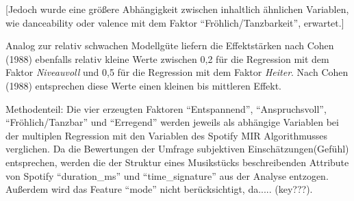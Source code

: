 [Jedoch wurde eine größere Abhängigkeit zwischen inhaltlich ähnlichen Variablen, wie danceability oder valence mit dem Faktor ``Fröhlich/Tanzbarkeit'', erwartet.]


Analog zur relativ schwachen Modellgüte liefern die Effektstärken nach Cohen (1988) ebenfalls relativ kleine Werte zwischen 0,2 für die Regression mit dem Faktor \textit{Niveauvoll} und 0,5 für die
Regression mit dem Faktor \textit{Heiter}.
Nach Cohen (1988) entsprechen diese Werte einen kleinen bis mittleren Effekt.


Methodenteil: Die vier erzeugten Faktoren ``Entspannend'', ``Anspruchsvoll'', ``Fröhlich/Tanzbar'' und ``Erregend'' werden jeweils als abhängige Variablen bei der multiplen Regression mit den Variablen des Spotify MIR Algorithmusses verglichen.
Da die Bewertungen der Umfrage subjektiven Einschätzungen(Gefühl) entsprechen, werden die der Struktur eines Musikstücks beschreibenden Attribute von Spotify ``duration\_ms'' und ``time\_signature'' aus der Analyse entzogen.
Außerdem wird das Feature ``mode'' nicht berücksichtigt, da..... (key???).
